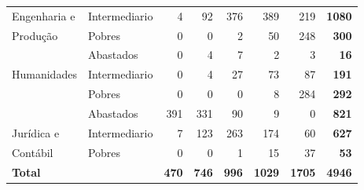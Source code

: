 \begin{table}[h]
\begin{tabular}{ll rrrrrr}
Engenharia e    		& Intermediario   &                  4 &           92 &         376 &        389 &              219 & \textbf{1080}\\ 
Produção                & Pobres          &                  0 &            0 &           2 &         50 &              248 & \textbf{300}\\ 
\midrule
						& Abastados       &                  0 &            4 &           7 &          2 &                3 & \textbf{16}\\ 
Humanidades             & Intermediario   &                  0 &            4 &          27 &         73 &               87 & \textbf{191}\\ 
                        & Pobres          &                  0 &            0 &           0 &          8 &              284 & \textbf{292}\\ 
\midrule
						& Abastados       &                391 &          331 &          90 &          9 &                0 & \textbf{821}\\ 
Jurídica e     			& Intermediario   &                  7 &          123 &         263 &        174 &               60 & \textbf{627}\\ 
Contábil                & Pobres          &                  0 &            0 &           1 &         15 &               37 & \textbf{53}\\ 
\midrule
\textbf{Total}	&  & \textbf{470} & \textbf{746} & \textbf{996}& \textbf{1029}& \textbf{1705}&\textbf{4946}\\  
\bottomrule
\end{tabular}
\end{table}

